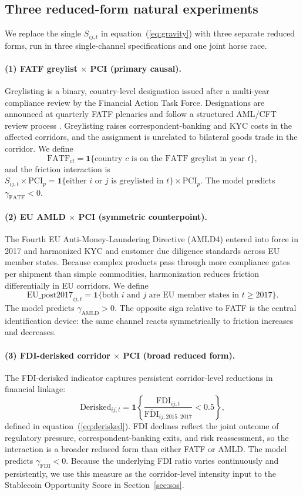 \subsection{Three reduced-form natural experiments}
\label{subsec:three_rf}

We replace the single $S_{ij,t}$ in equation~(\ref{eq:gravity}) with three separate reduced forms, run in three single-channel specifications and one joint horse race.

\paragraph{(1) FATF greylist $\times$ PCI (primary causal).}
Greylisting is a binary, country-level designation issued after a multi-year compliance review by the Financial Action Task Force. Designations are announced at quarterly FATF plenaries and follow a structured AML/CFT review process \citep{Borchert2024_broken_relationships}. Greylisting raises correspondent-banking and KYC costs in the affected corridors, and the assignment is unrelated to bilateral goods trade in the corridor. We define
\[
\text{FATF}_{ct} = \mathbf{1}\{\text{country } c \text{ is on the FATF greylist in year } t\},
\]
and the friction interaction is $S_{ij,t} \times \text{PCI}_p = \mathbf{1}\{\text{either } i \text{ or } j \text{ is greylisted in } t\} \times \text{PCI}_p$. The model predicts $\gamma_{\text{FATF}} < 0$.

\paragraph{(2) EU AMLD $\times$ PCI (symmetric counterpoint).}
The Fourth EU Anti-Money-Laundering Directive (AMLD4) entered into force in 2017 and harmonized KYC and customer due diligence standards across EU member states. Because complex products pass through more compliance gates per shipment than simple commodities, harmonization reduces friction differentially in EU corridors. We define
\[
\text{EU\_post2017}_{ij,t} = \mathbf{1}\{\text{both } i \text{ and } j \text{ are EU member states in } t \geq 2017\}.
\]
The model predicts $\gamma_{\text{AMLD}} > 0$. The opposite sign relative to FATF is the central identification device: the same channel reacts symmetrically to friction increases and decreases.

\paragraph{(3) FDI-derisked corridor $\times$ PCI (broad reduced form).}
The FDI-derisked indicator captures persistent corridor-level reductions in financial linkage:
\[
\text{Derisked}_{ij,t} = \mathbf{1}\left\{\frac{\text{FDI}_{ij,t}}{\overline{\text{FDI}}_{ij,2015\text{--}2017}} < 0.5\right\},
\]
defined in equation~(\ref{eq:derisked}). FDI declines reflect the joint outcome of regulatory pressure, correspondent-banking exits, and risk reassessment, so the interaction is a broader reduced form than either FATF or AMLD. The model predicts $\gamma_{\text{FDI}} < 0$. Because the underlying FDI ratio varies continuously and persistently, we use this measure as the corridor-level intensity input to the Stablecoin Opportunity Score in Section~\ref{sec:sos}.

